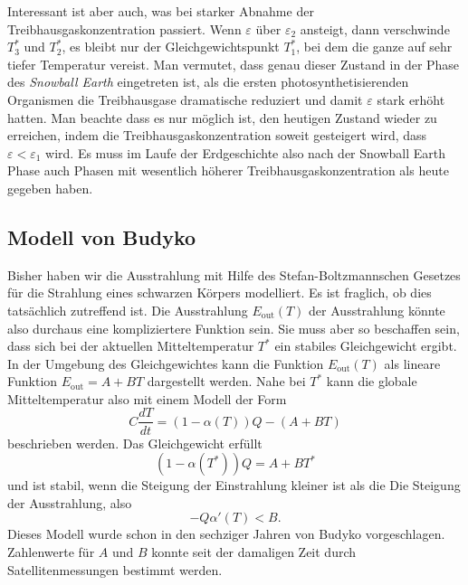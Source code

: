 Interessant ist aber auch, was bei starker Abnahme der
Treibhausgaskonzentration passiert.
Wenn $\varepsilon$ über $\varepsilon_2$ ansteigt, dann verschwinde
$T_3^*$ und $T_2^*$, es bleibt nur der Gleichgewichtspunkt $T_1^*$,
bei dem die ganze auf sehr tiefer Temperatur vereist.
Man vermutet, dass genau dieser Zustand in der Phase des {\em Snowball Earth}
eingetreten ist, als die ersten photosynthetisierenden Organismen die
Treibhausgase dramatische reduziert und damit $\varepsilon$ stark
erhöht hatten.
Man beachte dass es nur möglich ist, den heutigen Zustand wieder zu 
erreichen, indem die Treibhausgaskonzentration soweit gesteigert
wird, dass $\varepsilon<\varepsilon_1$ wird.
Es muss im Laufe der Erdgeschichte also nach der Snowball Earth Phase
auch Phasen mit wesentlich höherer Treibhausgaskonzentration als heute
gegeben haben.

\subsection{Modell von Budyko}
Bisher haben wir die Ausstrahlung mit Hilfe des Stefan-Boltzmannschen
Gesetzes für die Strahlung eines schwarzen Körpers modelliert.
Es ist fraglich, ob dies tatsächlich zutreffend ist.
Die Ausstrahlung $E_\text{out}(T)$ der Ausstrahlung könnte also durchaus
eine kompliziertere Funktion sein.
Sie muss aber so beschaffen sein, dass sich bei der aktuellen
Mitteltemperatur $T^*$ ein stabiles Gleichgewicht ergibt.
In der Umgebung des Gleichgewichtes kann die Funktion $E_\text{out}(T)$
als lineare Funktion
$E_\text{out}= A+BT$
dargestellt werden.
Nahe bei $T^*$ kann die globale Mitteltemperatur also mit einem Modell
der Form
\begin{equation}
C
\frac{dT}{dt}
=
(1-\alpha(T)) Q- (A+BT)
\end{equation}
beschrieben werden.
Das Gleichgewicht erfüllt
\[
(1-\alpha(T^*))Q=A+BT^*
\] 
und ist stabil, wenn die Steigung der Einstrahlung kleiner ist als die
Die Steigung der Ausstrahlung, also
\begin{equation}
-Q\alpha'(T)
<
B.
\label{skript:budyko:cond}
\end{equation}
Dieses Modell wurde schon in den sechziger Jahren von Budyko vorgeschlagen.
Zahlenwerte für $A$ und $B$ konnte seit der damaligen Zeit durch
Satellitenmessungen bestimmt werden.

